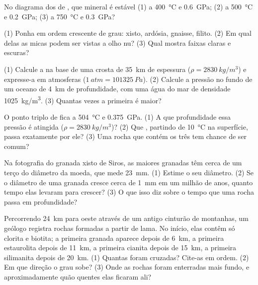 \begin{exercise}[$\star$]\label{exo:g12:metamorphic-rocks:4}
No diagrama dos  de , que mineral é estável (1) a
\qty{400}{\celsius} e \qty{0.6}{GPa}; (2) a \qty{500}{\celsius} e
\qty{0.2}{GPa}; (3) a \qty{750}{\celsius} e \qty{0.3}{GPa}?
\end{exercise}

\begin{exercise}[$\star$]\label{exo:g12:metamorphic-rocks:5}
(1) Ponha em ordem crescente de grau: xisto, ardósia, gnaisse, filito. (2)
Em qual delas as micas podem ser vistas a olho nu? (3) Qual mostra faixas
claras e escuras?
\end{exercise}

\begin{exercise}[$\star\star$]\label{exo:g12:metamorphic-rocks:6}
(1) Calcule a  na base de uma crosta de \qty{35}{km} de
espessura ($\rho = \qty{2830}{kg/m^3}$) e expresse-a em atmosferas
($\qty{1}{atm} = \qty{101325}{Pa}$). (2) Calcule a pressão no fundo de um
oceano de \qty{4}{km} de profundidade, com uma água do mar de densidade
\qty{1025}{kg/m^3}. (3) Quantas vezes a primeira é maior?
\end{exercise}

\begin{exercise}[$\star\star$]\label{exo:g12:metamorphic-rocks:7}
O ponto triplo de  fica a \qty{504}{\celsius} e
\qty{0.375}{GPa}. (1) A que profundidade essa pressão é atingida ($\rho =
\qty{2830}{kg/m^3}$)? (2) Que , partindo de
\qty{10}{\celsius} na superfície, passa exatamente por ele? (3) Uma rocha que
contém os três  tem chance de ser comum?
\end{exercise}

\begin{exercise}[$\star\star$]\label{exo:g12:metamorphic-rocks:8}
Na fotografia do granada xisto de Siros, as maiores granadas têm cerca de
um terço do diâmetro da moeda, que mede \qty{23}{mm}. (1) Estime o seu
diâmetro. (2) Se o diâmetro de uma granada cresce cerca de \qty{1}{mm} em
um milhão de anos, quanto tempo elas levaram para crescer? (3) O que isso
diz sobre o tempo que uma rocha passa em profundidade?
\end{exercise}

\begin{exercise}[$\star\star$]\label{exo:g12:metamorphic-rocks:9}
Percorrendo \qty{24}{km} para oeste através de um antigo cinturão de
montanhas, um geólogo registra rochas formadas a partir de lama. No início,
elas contêm só clorita e biotita; a primeira granada aparece depois de
\qty{6}{km}, a primeira estaurolita depois de \qty{11}{km}, a primeira
cianita depois de \qty{15}{km}, a primeira silimanita depois de
\qty{20}{km}. (1) Quantas  foram cruzadas? Cite-as em ordem.
(2) Em que direção o grau sobe? (3) Onde as rochas foram enterradas mais
fundo, e aproximadamente quão quentes elas ficaram ali?
\end{exercise}

